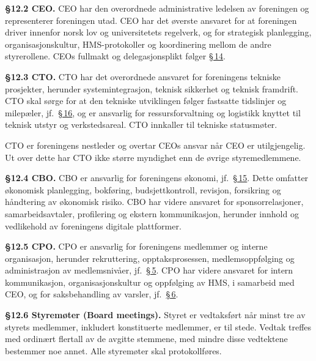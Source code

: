 \documentclass{../../../Common/Latex/Templates/rapport}
\begin{document}
\textbf{\S 12.2 CEO.}\label{nbylaw:12.2} CEO har den overordnede administrative ledelsen av foreningen og representerer foreningen utad. CEO har det øverste ansvaret for at foreningen driver innenfor norsk lov og universitetets regelverk, og for strategisk planlegging, organisasjonskultur, HMS-protokoller og koordinering mellom de andre styrerollene. CEOs fullmakt og delegasjonsplikt følger \hyperref[nbylaw:14]{\S\,14}.

\textbf{\S 12.3 CTO.}\label{nbylaw:12.3} CTO har det overordnede ansvaret for foreningens tekniske prosjekter, herunder systemintegrasjon, teknisk sikkerhet og teknisk framdrift. CTO skal sørge for at den tekniske utviklingen følger fastsatte tidslinjer og milepæler, jf.\ \hyperref[nbylaw:16]{\S\,16}, og er ansvarlig for ressursforvaltning og logistikk knyttet til teknisk utstyr og verkstedsareal. CTO innkaller til tekniske statusmøter.

CTO er foreningens nestleder og overtar CEOs ansvar n\r{a}r CEO er utilgjengelig. Ut over dette har CTO ikke større myndighet enn de øvrige styremedlemmene.

\textbf{\S 12.4 CBO.}\label{nbylaw:12.4} CBO er ansvarlig for foreningens økonomi, jf.\ \hyperref[nbylaw:15]{\S\,15}. Dette omfatter økonomisk planlegging, bokføring, budsjettkontroll, revisjon, forsikring og h\r{a}ndtering av økonomisk risiko. CBO har videre ansvaret for sponsorrelasjoner, samarbeidsavtaler, profilering og ekstern kommunikasjon, herunder innhold og vedlikehold av foreningens digitale plattformer.

\textbf{\S 12.5 CPO.}\label{nbylaw:12.5} CPO er ansvarlig for foreningens medlemmer og interne organisasjon, herunder rekruttering, opptaksprosessen, medlemsoppfølging og administrasjon av medlemsniv\r{a}er, jf.\ \hyperref[nbylaw:5]{\S\,5}. CPO har videre ansvaret for intern kommunikasjon, organisasjonskultur og oppfølging av HMS, i samarbeid med CEO, og for saksbehandling av varsler, jf.\ \hyperref[nbylaw:6]{\S\,6}.

\textbf{\S 12.6 Styremøter (Board meetings).}\label{nbylaw:12.6} Styret er vedtaksført n\r{a}r minst tre av styrets medlemmer, inkludert konstituerte medlemmer, er til stede. Vedtak treffes med ordinært flertall av de avgitte stemmene, med mindre disse vedtektene bestemmer noe annet. Alle styremøter skal protokollføres.
\end{document}
